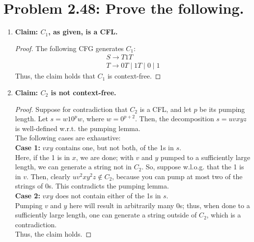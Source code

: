 \documentclass[12pt]{article}
\begin{document}
\section*{Problem 2.48: Prove the following.}
\begin{enumerate}[label=(\alph*)]
\item \textbf{Claim: $C_{1}$, as given, is a CFL.}
  \begin{proof}
    The following CFG generates $C_{1}$:
    \begin{align*}
      S \rightarrow T1T \nonumber \\
      T \rightarrow 0T \mid 1T \mid 0 \mid 1 \nonumber
    \end{align*}
    Thus, the claim holds that $C_{1}$ is context-free.
  \end{proof}
\item \textbf{Claim: $C_{2}$ is not context-free.}
  \begin{proof}
    Suppose for contradiction that $C_{2}$ is a CFL, and let $p$ be its pumping length. Let $s = w10^{p}w$, where $w = 0^{p+2}$. Then, the decomposition $s = uvxyz$ is well-defined w.r.t. the pumping lemma. \\
    \newline
    The following cases are exhaustive: \\
    \newline
    \textbf{Case 1:} $vxy$ contains one, but not both, of the 1s in $s$. \\
    \newline
    Here, if the 1 is in $x$, we are done; with $v$ and $y$ pumped to a sufficiently large length, we can generate a string not in $C_{2}$. So, suppose w.l.o.g. that the 1 is in $v$. Then, clearly $uv^{2}xy^{2}z \notin C_{2}$, because you can pump at most two of the strings of 0s. This contradicts the pumping lemma. \\
    \newline
    \textbf{Case 2:} $vxy$ does not contain either of the 1s in $s$. \\
    \newline
    Pumping $v$ and $y$ here will result in arbitrarily many 0s; thus, when done to a sufficiently large length, one can generate a string outside of $C_{2}$, which is a contradiction. \\
    \newline
    Thus, the claim holds.
  \end{proof}
\end{enumerate}
\end{document}
